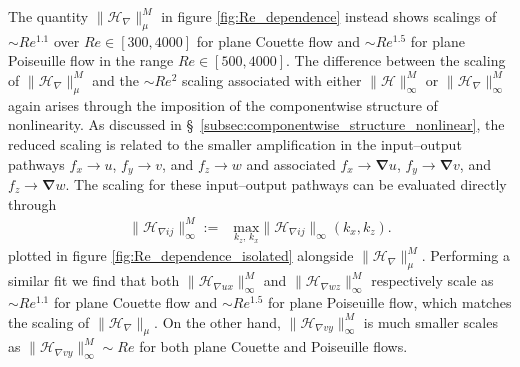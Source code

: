 The quantity $\|\mathcal{H}_{\nabla}\|_{\mu}^M$ in figure \ref{fig:Re_dependence} instead shows scalings of $\sim Re^{1.1}$ over $Re\in[300,4000]$ for plane Couette flow and $\sim Re^{1.5}$ for plane Poiseuille flow in the range $Re\in [500,4000]$. The difference between the scaling of $\|\mathcal{H}_{\nabla}\|_{\mu}^M$ and the $\sim Re^2$ scaling associated with either $\|\mathcal{H}\|_{\infty}^M$ or $\|\mathcal{H}_{\nabla}\|_{\infty}^M$ again arises through the imposition of the componentwise structure of nonlinearity. As discussed in \S\ \ref{subsec:componentwise_structure_nonlinear},  the reduced scaling is related to the smaller amplification in the input--output pathways $f_x\rightarrow u$, $f_y\rightarrow v$, and $f_z\rightarrow w$ and associated $f_x\rightarrow \boldsymbol{\nabla} u$, $f_y\rightarrow \boldsymbol{\nabla} v$, and $f_z\rightarrow \boldsymbol{\nabla} w$. The scaling for these input--output pathways can be evaluated directly through 
\begin{align}
    \|\mathcal{H}_{\nabla ij}\|_{\infty}^{M}:=&\underset{k_z,\,k_x}{\text{max}}\|\mathcal{H}_{\nabla ij}\|_{\infty}(k_x,k_z). 
\end{align}
 plotted in figure \ref{fig:Re_dependence_isolated} alongside  $\|\mathcal{H}_{\nabla}\|_{\mu}^M$.  Performing a similar fit we find that both $\|\mathcal{H}_{\nabla ux}\|_{\infty}^M$ and $\|\mathcal{H}_{\nabla wz}\|_{\infty}^M$ respectively scale as $\sim Re^{1.1}$ for plane Couette flow and $\sim Re^{1.5}$ for plane Poiseuille flow, which matches the scaling of $\|\mathcal{H}_{\nabla}\|_{\mu}$. On the other hand, $\|\mathcal{H}_{\nabla vy}\|_{\infty}^M$ is much smaller   scales as $\|\mathcal{H}_{\nabla vy}\|_{\infty}^M\sim Re$ for both plane Couette and Poiseuille flows. 


